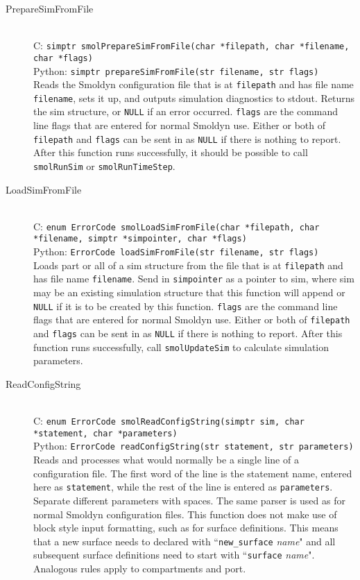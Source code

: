 \documentclass {book}
\newcommand {\ttt} {\texttt}
\begin{document}
\begin{description}

\item[PrepareSimFromFile]
\hfill \\
C: \ttt{simptr smolPrepareSimFromFile(char *filepath, char *filename, char *flags)}\\
Python: \ttt{simptr prepareSimFromFile(str filename, str flags)}\\
Reads the Smoldyn configuration file that is at \ttt{filepath} and has file name \ttt{filename}, sets it up, and outputs simulation diagnostics to stdout. Returns the sim structure, or \ttt{NULL} if an error occurred. \ttt{flags} are the command line flags that are entered for normal Smoldyn use. Either or both of \ttt{filepath} and \ttt{flags} can be sent in as \ttt{NULL} if there is nothing to report. After this function runs successfully, it should be possible to call \ttt{smolRunSim} or \ttt{smolRunTimeStep}.

\item[LoadSimFromFile]
\hfill \\
C: \ttt{enum ErrorCode smolLoadSimFromFile(char *filepath, char *filename, simptr *simpointer, char *flags)}\\
Python: \ttt{ErrorCode loadSimFromFile(str filename, str flags)}\\
Loads part or all of a sim structure from the file that is at \ttt{filepath} and has file name \ttt{filename}. Send in \ttt{simpointer} as a pointer to sim, where sim may be an existing simulation structure that this function will append or \ttt{NULL} if it is to be created by this function. \ttt{flags} are the command line flags that are entered for normal Smoldyn use. Either or both of \ttt{filepath} and \ttt{flags} can be sent in as \ttt{NULL} if there is nothing to report. After this function runs successfully, call \ttt{smolUpdateSim} to calculate simulation parameters.

\item[ReadConfigString]
\hfill \\
C: \ttt{enum ErrorCode smolReadConfigString(simptr sim, char *statement, char *parameters)}\\
Python: \ttt{ErrorCode readConfigString(str statement, str parameters)}\\
Reads and processes what would normally be a single line of a configuration file. The first word of the line is the statement name, entered here as \ttt{statement}, while the rest of the line is entered as \ttt{parameters}. Separate different parameters with spaces. The same parser is used as for normal Smoldyn configuration files. This function does not make use of block style input formatting, such as for surface definitions. This means that a new surface needs to declared with ``\ttt{new\_surface} \emph{name}" and all subsequent surface definitions need to start with ``\ttt{surface} \emph{name}". Analogous rules apply to compartments and port.

\end{description}
\end{document}

